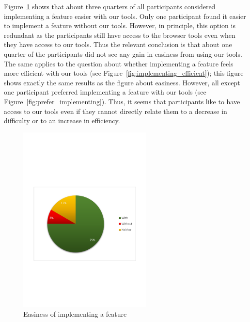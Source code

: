 Figure~\ref{fig:implementing_easier} shows that about three quarters of all participants considered implementing a feature easier with our tools. Only one participant found it easier to implement a feature without our tools. However, in principle, this option is redundant as the participants still have access to the browser tools even when they have access to our tools. Thus the relevant conclusion is that about one quarter of the participants did not see any gain in easiness from using our tools. The same applies to the question about whether implementing a feature feels more efficient with our tools (see Figure~\ref{fig:implementing_efficient}); this figure shows exactly the same results as the figure about easiness. However, all except one participant preferred implementing a feature with our tools (see Figure~\ref{fig:prefer_implementing}). Thus, it seems that participants like to have access to our tools even if they cannot directly relate them to a decrease in difficulty or to an increase in efficiency.
\begin{figure}[H]
  \centering
    \includegraphics[width=0.6\textwidth]{images/charts/implementing_easier.pdf}
	\caption[Easiness of implementing]{Easiness of implementing a feature}
	\label{fig:implementing_easier}
\end{figure}

